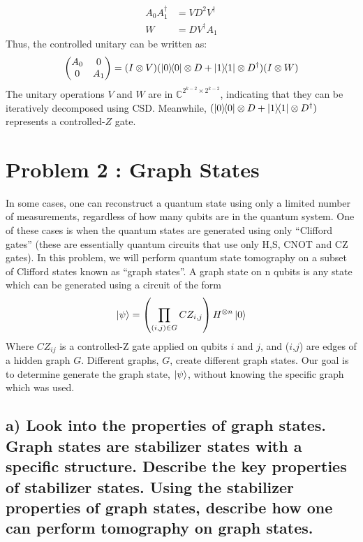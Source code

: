\documentclass[a4paper, 11pt]{article}
\begin{document}
\begin{align}
  A_{0} A_{1}^{\dagger} &= V D^2 V^{\dagger} \\
  W & = D V^{\dagger} A_{1} 
\end{align}
Thus, the controlled unitary can be written as:
\begin{equation}
\begin{pmatrix}
  A_{0} & 0 \\
  0 & A_{1}
\end{pmatrix} = 
(I \otimes V) (\ketbra{0} \otimes D + \ketbra{1} \otimes D^{\dagger}) (I \otimes W)
\end{equation}
The unitary operations $V$ and $W$ are in $\mathbb{C}^{2^{k-2} \times 2^{k-2}}$, indicating that they can be iteratively decomposed using CSD. 
Meanwhile, $(\ketbra{0} \otimes D + \ketbra{1} \otimes D^\dagger)$ represents a controlled-$Z$ gate.


\section*{Problem 2 : Graph States}

In some cases, one can reconstruct a quantum state using only a limited number of measurements, regardless of how many qubits are in the quantum system. One of these cases is when the quantum states are generated using only “Clifford gates” (these are essentially quantum circuits that use only H,S, CNOT and CZ gates). In this problem, we will perform quantum state tomography on a subset of Clifford states known as “graph states”. A graph state on n qubits is any state which can be generated using a circuit of the form
\begin{equation}
  \ket{\psi} = \left(\prod_{(i,j)\in G} CZ_{i,j}\right) H^{\otimes n} \ket{0}
\end{equation}
Where $CZ_{ij}$ is a controlled-Z gate applied on qubits $i$ and $j$, and ($i$,$j$) are edges of a hidden graph $G$. Different graphs, $G$, create different graph states. Our goal is to determine generate the graph state, $\ket{\psi}$, without knowing the specific graph which was used.
\subsection*{a) Look into the properties of graph states.
Graph states are stabilizer states with a specific structure. Describe the key properties of stabilizer states. Using the stabilizer properties of graph states, describe how one can perform tomography on graph states.}
\end{document}
